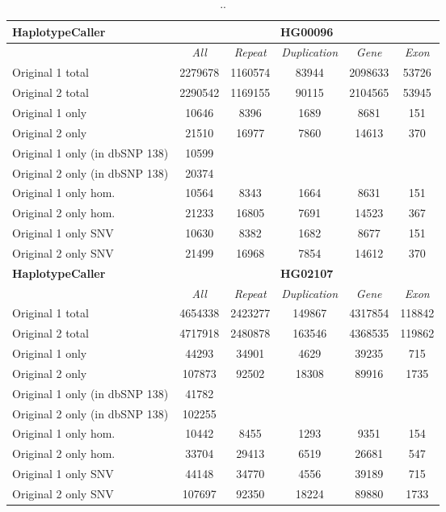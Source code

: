 \begin{table}[htb]
\begin{center}
\begin{tabular}{|l|c||c|c|c|c|}
\hline
{\bf HaplotypeCaller} & \multicolumn{5}{|c|}{\bf HG00096} \\
\hline
\cline{2-6}
{\bf} & {\it All} & {\it Repeat} & {\it Duplication} & {\it Gene} & {\it Exon} \\
\hline
Original 1 total & 2279678 & 1160574 & 83944 & 2098633 & 53726\\
\hline
Original 2 total & 2290542 & 1169155 & 90115 & 2104565 & 53945\\
\hline
Original 1 only & 10646 & 8396 & 1689 & 8681 & 151\\
\hline 
Original 2 only & 21510 & 16977 & 7860 & 14613 & 370\\
\hline 
Original 1 only (in dbSNP 138) & 10599 &  &  &  & \\
\hline 
Original 2 only (in dbSNP 138) & 20374 &  &  &  & \\
\hline 
Original 1 only hom. & 10564 & 8343 & 1664 & 8631 & 151\\
\hline 
Original 2 only hom. & 21233 & 16805 & 7691 & 14523 & 367\\
\hline 
Original 1 only SNV & 10630 & 8382 & 1682 & 8677 & 151\\
\hline 
Original 2 only SNV & 21499 & 16968 & 7854 & 14612 & 370\\
\hline
\hline
{\bf HaplotypeCaller} & \multicolumn{5}{|c|}{\bf HG02107} \\
\hline
\cline{2-6}
{\bf} & {\it All} & {\it Repeat} & {\it Duplication} & {\it Gene} & {\it Exon} \\
\hline
Original 1 total & 4654338 & 2423277 & 149867 & 4317854 & 118842\\ 
\hline
Original 2 total & 4717918 & 2480878 & 163546 & 4368535 & 119862\\ 
\hline
Original 1 only & 44293 & 34901 & 4629 & 39235 & 715\\
\hline 
Original 2 only & 107873 & 92502 & 18308 & 89916 & 1735\\
\hline 
Original 1 only (in dbSNP 138) & 41782 &  &  &  & \\
\hline 
Original 2 only (in dbSNP 138) & 102255 &  &  &  & \\
\hline 
Original 1 only hom. & 10442 & 8455 & 1293 & 9351 & 154\\
\hline 
Original 2 only hom. & 33704 & 29413 & 6519 & 26681 & 547\\
\hline 
Original 1 only SNV & 44148 & 34770 & 4556 & 39189 & 715\\
\hline 
Original 2 only SNV & 107697 & 92350 & 18224 & 89880 & 1733\\
\hline 
\end{tabular}
\end{center}
\caption{ .. }
\label{tab:orig-vs-orig2-hc}
\end{table}

